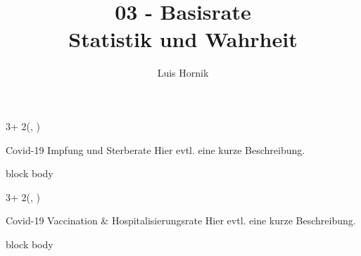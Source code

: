 \documentclass{beamer}
\title{03 - Basisrate \\
	\Large{Statistik und Wahrheit}}
\author{%
	Luis Hornik
}
\date{}
\newlength{\blockOne}
\begin{document}


\begin{frame}[t]	%





\TPshowboxestrue




\begin{textblock*}{3\colwidth + 2\colsep}(\leftmargin, \blockOne)

\begin{alertblock}{%
	\begin{minipage}[b]{60pt}
		\RaggedRight
		\noindent\hspace{-10pt}
	\end{minipage}%
	\begin{minipage}[b]{3\colwidth+2\colsep-125pt}\strut%
		Covid-19 Impfung und Sterberate \;
		{\mdseries Hier evtl. eine kurze Beschreibung.}
	\end{minipage}%
}

	\vspace{-0.25cm}
	\begin{minipage}{\textwidth}
		\begin{beamercolorbox}[
			ht = 23.5cm, 
			wd = \linewidth, 
			left
		]{block body}

\begin{textblock*}{3\colwidth + 2\colsep}(\leftmargin, \blockOne)

\begin{alertblock}{%
	\begin{minipage}[b]{60pt}
		\RaggedRight
		\noindent\hspace{-10pt}
	\end{minipage}%
	\begin{minipage}[b]{3\colwidth+2\colsep-125pt}\strut%
		Covid-19 Vaccination \& Hospitalisierungsrate \;
		{\mdseries Hier evtl. eine kurze Beschreibung.}
	\end{minipage}%
}
	\vspace{-0.25cm}
	\begin{minipage}{\textwidth}
		\begin{beamercolorbox}[
			ht = 23.5cm, 
			wd = \linewidth, 
			left
		]{block body}
			

\end{beamercolorbox}
\end{minipage}
\end{alertblock}
\end{textblock*}
\end{beamercolorbox}
\end{minipage}
\end{alertblock}
\end{textblock*}
\end{frame}
\end{document}
